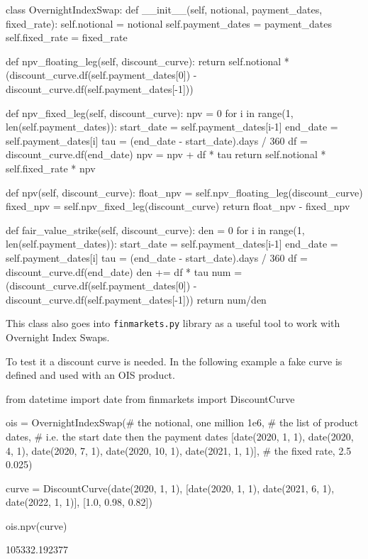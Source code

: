 \begin{ipython}
class OvernightIndexSwap:
    def __init__(self, notional, payment_dates, fixed_rate):
        self.notional = notional 
        self.payment_dates = payment_dates
        self.fixed_rate = fixed_rate

    def npv_floating_leg(self, discount_curve):
        return self.notional * (discount_curve.df(self.payment_dates[0]) -
                                discount_curve.df(self.payment_dates[-1]))

    def npv_fixed_leg(self, discount_curve):
        npv = 0
        for i in range(1, len(self.payment_dates)):
            start_date = self.payment_dates[i-1]
            end_date = self.payment_dates[i]
            tau = (end_date - start_date).days / 360
            df = discount_curve.df(end_date)
            npv = npv + df * tau
        return self.notional * self.fixed_rate * npv

    def npv(self, discount_curve):
        float_npv = self.npv_floating_leg(discount_curve)
        fixed_npv = self.npv_fixed_leg(discount_curve)
        return float_npv - fixed_npv

    def fair_value_strike(self, discount_curve):
        den = 0
        for i in range(1, len(self.payment_dates)):
            start_date = self.payment_dates[i-1]
            end_date = self.payment_dates[i]
            tau = (end_date - start_date).days / 360
            df = discount_curve.df(end_date)
            den += df * tau
            num = (discount_curve.df(self.payment_dates[0]) -
                discount_curve.df(self.payment_dates[-1]))
        return num/den

\end{ipython}

\begin{finmarkets}
This class also goes into \texttt{finmarkets.py} library as a useful tool to work with Overnight Index Swaps.
\end{finmarkets}

To test it a discount curve is needed. In the following example a fake curve is defined and used with an OIS product.

\begin{ipython}
from datetime import date
from finmarkets import DiscountCurve

ois = OvernightIndexSwap(# the notional, one million
                         1e6,
                         # the list of product dates,
                         # i.e. the start date then the payment dates
                         [date(2020, 1, 1), date(2020, 4, 1),
                          date(2020, 7, 1), date(2020, 10, 1),
                          date(2021, 1, 1)],
                         # the fixed rate, 2.5%
                         0.025)

curve = DiscountCurve(date(2020, 1, 1),
                      [date(2020, 1, 1), date(2021, 6, 1),
                       date(2022, 1, 1)],
                      [1.0, 0.98, 0.82])

ois.npv(curve)
\end{ipython}
\begin{ioutput}
105332.192377
\end{ioutput}

